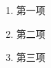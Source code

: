 \documentclass{ctexart}
\begin{document}
  \begin{enumerate}
    \item 第一项
    \item 第二项
    \item 第三项
  \end{enumerate}
\end{document}
